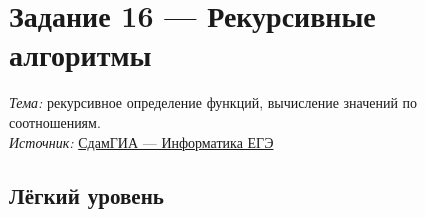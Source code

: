 \documentclass[a4paper]{article}
\begin{document}
\Large
\section*{Задание 16 — Рекурсивные алгоритмы}

\normalsize
\textit{Тема:} рекурсивное определение функций, вычисление значений по соотношениям.\\
\textit{Источник:} \href{https://inf-ege.sdamgia.ru/}{СдамГИА — Информатика ЕГЭ}

\bigskip


\subsection*{\textcolor{easycolor}{Лёгкий уровень}}
\end{document}
